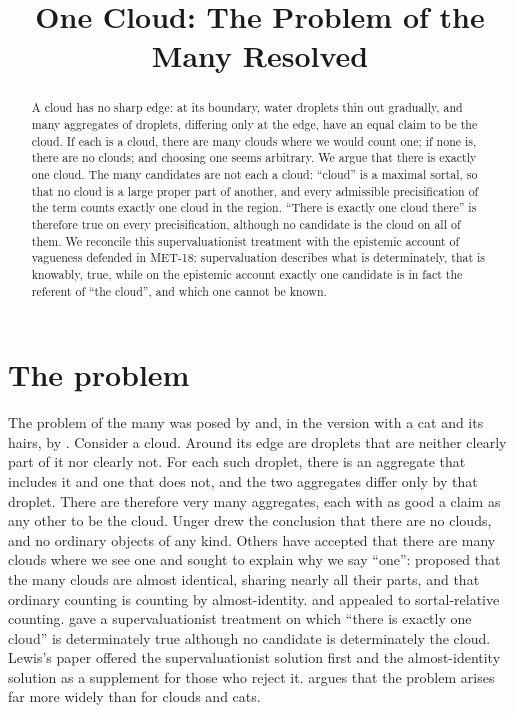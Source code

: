 \documentclass{situationist-preprint}
\title{One Cloud: The Problem of the Many Resolved}
\begin{document}
\maketitle

\begin{abstract}
A cloud has no sharp edge: at its boundary, water droplets thin out gradually, and many aggregates of droplets, differing only at the edge, have an equal claim to be the cloud. If each is a cloud, there are many clouds where we would count one; if none is, there are no clouds; and choosing one seems arbitrary. We argue that there is exactly one cloud. The many candidates are not each a cloud: \enquote{cloud} is a maximal sortal, so that no cloud is a large proper part of another, and every admissible precisification of the term counts exactly one cloud in the region. \enquote{There is exactly one cloud there} is therefore true on every precisification, although no candidate is the cloud on all of them. We reconcile this supervaluationist treatment with the epistemic account of vagueness defended in MET-18: supervaluation describes what is determinately, that is knowably, true, while on the epistemic account exactly one candidate is in fact the referent of \enquote{the cloud}, and which one cannot be known.
\end{abstract}

\section{The problem}

The problem of the many was posed by \citet{Unger1980} and, in the version with a cat and its hairs, by \citet{Geach1980}. Consider a cloud. Around its edge are droplets that are neither clearly part of it nor clearly not. For each such droplet, there is an aggregate that includes it and one that does not, and the two aggregates differ only by that droplet. There are therefore very many aggregates, each with as good a claim as any other to be the cloud. Unger drew the conclusion that there are no clouds, and no ordinary objects of any kind. Others have accepted that there are many clouds where we see one and sought to explain why we say \enquote{one}: \citet{Lewis1993} proposed that the many clouds are almost identical, sharing nearly all their parts, and that ordinary counting is counting by almost-identity. \citet{Lowe1982} and \citet{Geach1980} appealed to sortal-relative counting. \citet{McGee2000} gave a supervaluationist treatment on which \enquote{there is exactly one cloud} is determinately true although no candidate is determinately the cloud. Lewis's paper offered the supervaluationist solution first and the almost-identity solution as a supplement for those who reject it. \citet{Weatherson2003} argues that the problem arises far more widely than for clouds and cats.
\end{document}

